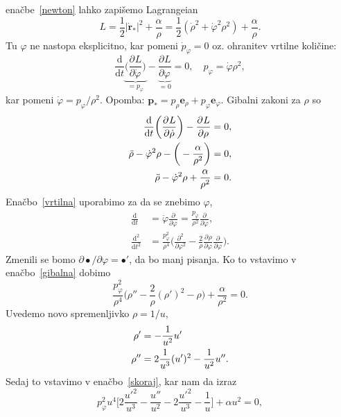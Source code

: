 \documentclass[12pt, a4paper]{article}
\renewcommand{\r}{
    \ensuremath{\mathbf{r}}
}
\newcommand{\p}{
    \ensuremath{\mathbf{p}}
}
\newcommand{\ee}{
    \ensuremath{\mathbf{e}}
}
\newcommand{\der}[3][]{
    \ensuremath{ \frac{\partial^{#1} #2}{\partial #3^{#1}} }
}
\renewcommand{\d}{
    \ensuremath{\mathrm{d}}
}
\begin{document}
ena\v cbe~\eqref{newton} lahko zapi\v semo Lagrangeian
\begin{equation*}
    L = \frac{1}{2}|\dot{\r}_*|^2 + \frac{\alpha}{\rho} = \frac{1}{2}(\dot{\rho}^2 + \dot{\varphi}^2\rho^2) +
        \frac{\alpha}{\rho}.
\end{equation*}
Tu $\varphi$ ne nastopa eksplicitno, kar pomeni $\dot{p}_\varphi = 0$ oz. ohranitev vrtilne koli\v cine:
\begin{equation}
    \frac{\d}{\d t}\underbrace{\bigg(\der{L}{\dot{\varphi}}\bigg)}_{= p_\varphi} -
        \underbrace{\der{L}{\varphi}}_{= 0} = 0, \quad p_\varphi = \dot{\varphi}\rho^2,
    \label{vrtilna}
\end{equation}
kar pomeni $\dot{\varphi} = p_\varphi/\rho^2$. Opomba: $\p_* = p_\rho\ee_\rho + p_\varphi\ee_\varphi$. Gibalni zakoni
za $\rho$ so
\begin{align}
    \frac{\d}{\d t}\bigg(\der{L}{\dot{\rho}}\bigg) - \der{L}{\rho} &= 0, \notag \\
    \ddot{\rho} - \dot{\varphi}^2\rho - \bigg(-\frac{\alpha}{\rho^2}\bigg) &= 0, \notag \\
    \ddot{\rho} - \dot{\varphi}^2\rho + \frac{\alpha}{\rho^2} &= 0.
    \label{gibalna}
\end{align}
Ena\v cbo~\eqref{vrtilna} uporabimo za da se znebimo $\varphi$,
\begin{align}
    \frac{\d}{\d t} &= \dot{\varphi}\der{}{\varphi} = \frac{p_\varphi}{\rho^2}\der{}{\varphi}, \\
    \frac{\d^2}{\d t^2} &= \frac{p^2_\varphi}{\rho^4}\bigg(\der[2]{}{\varphi} - \frac{2}{\rho}\der{\rho}{\varphi}
        \der{}{\varphi}\bigg).
\end{align}
Zmenili se bomo $\partial \bullet/\partial \varphi = \bullet'$, da bo manj pisanja. Ko to vstavimo v
ena\v cbo~\eqref{gibalna} dobimo
\begin{equation}
    \frac{p^2_\varphi}{\rho^4}\bigg(\rho'' - \frac{2}{\rho}(\rho')^2 - \rho\bigg) + \frac{\alpha}{\rho^2} = 0.
    \label{skoraj}
\end{equation}
Uvedemo novo spremenljivko $\rho = 1/u$,
\begin{align}
    \rho' &= -\frac{1}{u^2}u' \notag \\
    \rho'' &= 2\frac{1}{u^3}(u')^2 - \frac{1}{u^2}u''.
\end{align}
Sedaj to vstavimo v ena\v cbo~\eqref{skoraj}, kar nam da izraz
\begin{equation*}
    p^2_\varphi u^4\bigg[2\frac{u'^2}{u^3} - \frac{u''}{u^2} - 2\frac{u'^2}{u^3} - \frac{1}{u}\bigg] + \alpha u^2 = 0,
\end{equation*}
\end{document}
